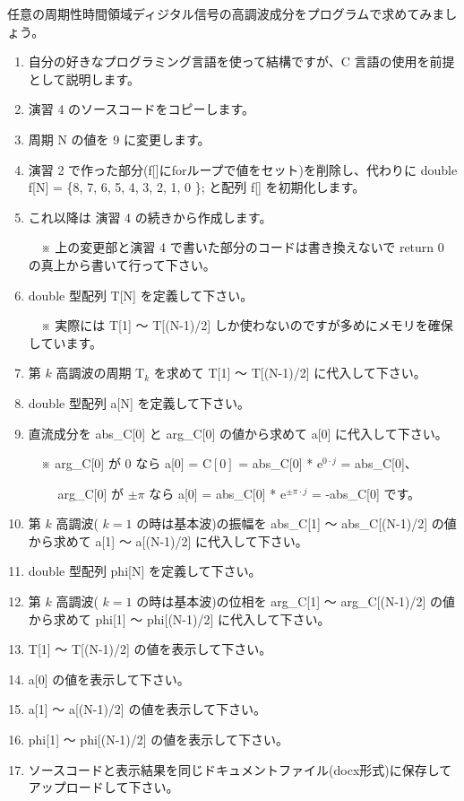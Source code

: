 \documentclass[a4paper]{jarticle}
\begin{document}
 任意の周期性時間領域ディジタル信号の高調波成分をプログラムで求めてみましょう。 \par
\par\vspace{1zh}
\begin{enumerate}
\item 自分の好きなプログラミング言語を使って結構ですが、C 言語の使用を前提として説明します。
\item 演習 4 のソースコードをコピーします。
\item 周期 N の値を 9 に変更します。
\item 演習 2 で作った部分(f[]にforループで値をセット)を削除し、代わりに double f[N] = \{8, 7, 6, 5, 4, 3, 2, 1, 0 \}; と配列 f[] を初期化します。
\item これ以降は 演習 4 の続きから作成します。\par
　※ 上の変更部と演習 4 で書いた部分のコードは書き換えないで return 0 の真上から書いて行って下さい。
\item double 型配列 T[N] を定義して下さい。\par
　※ 実際には T[1] 〜 T[(N-1)/2] しか使わないのですが多めにメモリを確保しています。
\item 第 $k$ 高調波の周期 $\textrm{T}_k$ を求めて T[1] 〜 T[(N-1)/2] に代入して下さい。
\item double 型配列 a[N] を定義して下さい。
\item 直流成分を abs\_C[0] と arg\_C[0] の値から求めて a[0] に代入して下さい。\par
　※ arg\_C[0] が 0 なら a[0] = $\textrm{C}[0]$ = abs\_C[0] * $\textrm{e}^{0\cdot j}$ = abs\_C[0]、\par
　 　arg\_C[0] が $\pm\pi$ なら a[0] = abs\_C[0] * $\textrm{e}^{\pm\pi \cdot j}$ = -abs\_C[0] です。
\item 第 $k$ 高調波( $k = 1$ の時は基本波)の振幅を abs\_C[1] 〜  abs\_C[(N-1)/2] の値から求めて a[1] 〜 a[(N-1)/2] に代入して下さい。
\item double 型配列 phi[N] を定義して下さい。
\item 第 $k$ 高調波( $k = 1$ の時は基本波)の位相を arg\_C[1] 〜 arg\_C[(N-1)/2] の値から求めて phi[1] 〜 phi[(N-1)/2] に代入して下さい。
\item T[1] 〜 T[(N-1)/2] の値を表示して下さい。
\item a[0] の値を表示して下さい。
\item a[1] 〜 a[(N-1)/2] の値を表示して下さい。
\item phi[1] 〜 phi[(N-1)/2] の値を表示して下さい。
\item ソースコードと表示結果を同じドキュメントファイル(docx形式)に保存してアップロードして下さい。
\end{enumerate}
\end{document}
